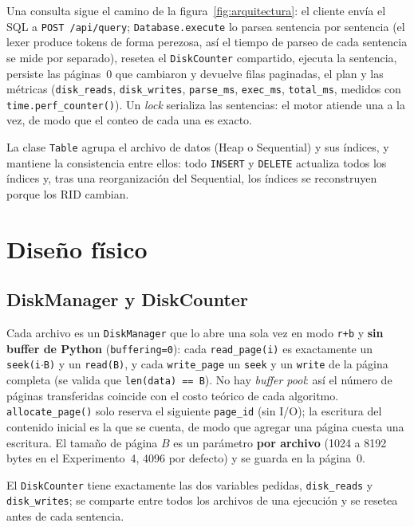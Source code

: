\documentclass[11pt,a4paper]{article}
\newcommand{\code}[1]{\texttt{#1}}
\begin{document}
Una consulta sigue el camino de la figura~\ref{fig:arquitectura}: el cliente envía el SQL a
\code{POST /api/query}; \code{Database.execute} lo parsea sentencia por sentencia (el lexer produce
tokens de forma perezosa, así el tiempo de parseo de cada sentencia se mide por separado), resetea el
\code{DiskCounter} compartido, ejecuta la sentencia, persiste las páginas~0 que cambiaron y devuelve
filas paginadas, el plan y las métricas (\code{disk\_reads}, \code{disk\_writes}, \code{parse\_ms},
\code{exec\_ms}, \code{total\_ms}, medidos con \code{time.perf\_counter()}). Un \emph{lock} serializa
las sentencias: el motor atiende una a la vez, de modo que el conteo de cada una es exacto.

La clase \code{Table} agrupa el archivo de datos (Heap o Sequential) y sus índices, y mantiene la
consistencia entre ellos: todo \code{INSERT} y \code{DELETE} actualiza todos los índices y, tras una
reorganización del Sequential, los índices se reconstruyen porque los RID cambian.

\section{Diseño físico}

\subsection{DiskManager y DiskCounter}

Cada archivo es un \code{DiskManager} que lo abre una sola vez en modo \code{r+b} y \textbf{sin buffer
de Python} (\code{buffering=0}): cada \code{read\_page(i)} es exactamente un \code{seek(i$\cdot$B)} y
un \code{read(B)}, y cada \code{write\_page} un \code{seek} y un \code{write} de la página completa
(se valida que \code{len(data) == B}). No hay \emph{buffer pool}: así el número de páginas
transferidas coincide con el costo teórico de cada algoritmo. \code{allocate\_page()} solo reserva
el siguiente \code{page\_id} (sin I/O); la escritura del contenido inicial es la que se cuenta, de
modo que agregar una página cuesta una escritura. El tamaño de página $B$ es un parámetro
\textbf{por archivo} (1024 a 8192 bytes en el Experimento~4, 4096 por defecto) y se guarda en la
página~0.

El \code{DiskCounter} tiene exactamente las dos variables pedidas, \code{disk\_reads} y
\code{disk\_writes}; se comparte entre todos los archivos de una ejecución y se resetea antes de cada
sentencia.
\end{document}
